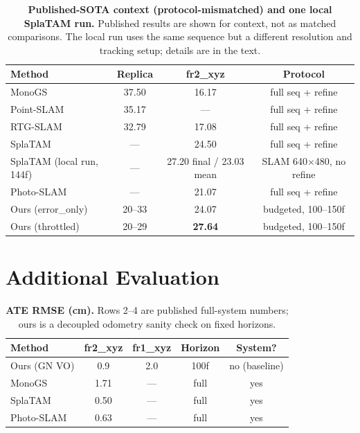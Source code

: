 \documentclass[10pt,twocolumn,letterpaper]{article}
\begin{document}
\begin{table}[t]
\centering
\footnotesize\setlength{\tabcolsep}{3pt}
\begin{tabular}{lccc}
\toprule
\textbf{Method} & \textbf{Replica} & \textbf{fr2\_xyz} & \textbf{Protocol} \\
\midrule
MonoGS & 37.50 & 16.17 & full seq + refine \\
Point-SLAM & 35.17 & --- & full seq + refine \\
RTG-SLAM & 32.79 & 17.08 & full seq + refine \\
SplaTAM & --- & 24.50 & full seq + refine \\
SplaTAM (local run, 144f) & --- & 27.20 final / 23.03 mean & SLAM 640$\times$480, no refine \\
Photo-SLAM & --- & 21.07 & full seq + refine \\
Ours (error\_only) & 20--33 & 24.07 & budgeted, 100--150f \\
Ours (throttled) & 20--29 & \textbf{27.64} & budgeted, 100--150f \\
\bottomrule
\end{tabular}
\caption{\textbf{Published-SOTA context (protocol-mismatched) and one local SplaTAM run.} Published results are shown for context, not as matched comparisons. The local run uses the same sequence but a different resolution and tracking setup; details are in the text.}
\label{tab:sota}
\end{table}

\section{Additional Evaluation}
\begin{table}[tbp]
\centering
\footnotesize\setlength{\tabcolsep}{3pt}
\begin{tabular}{lcccc}
\toprule
\textbf{Method} & \textbf{fr2\_xyz} & \textbf{fr1\_xyz} & \textbf{Horizon} & \textbf{System?} \\
\midrule
Ours (GN VO) & 0.9 & 2.0 & 100f & no (baseline) \\
MonoGS & 1.71 & --- & full & yes \\
SplaTAM & 0.50 & --- & full & yes \\
Photo-SLAM & 0.63 & --- & full & yes \\
\bottomrule
\end{tabular}
\caption{\textbf{ATE RMSE (cm).} Rows 2--4 are published full-system numbers; ours is a decoupled odometry sanity check on fixed horizons.}
\label{tab:ate}
\end{table}
\end{document}
